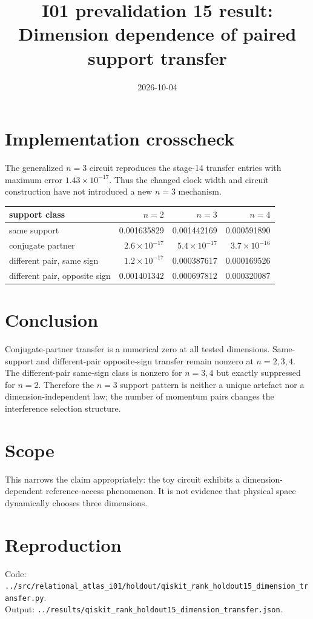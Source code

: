 \documentclass[11pt]{article}
\begin{document}
\title{I01 prevalidation 15 result:\\Dimension dependence of paired support transfer}
\date{2026-10-04}
\maketitle

\section*{Implementation crosscheck}
The generalized $n=3$ circuit reproduces the stage-14 transfer entries with maximum
error $1.43\times10^{-17}$. Thus the changed clock width and circuit construction
have not introduced a new $n=3$ mechanism.

\begin{center}
\begin{tabular}{lrrr}
\toprule
support class & $n=2$ & $n=3$ & $n=4$\\
\midrule
same support & 0.001635829 & 0.001442169 & 0.000591890\\
conjugate partner & $2.6\times10^{-17}$ & $5.4\times10^{-17}$ & $3.7\times10^{-16}$\\
different pair, same sign & $1.2\times10^{-17}$ & 0.000387617 & 0.000169526\\
different pair, opposite sign & 0.001401342 & 0.000697812 & 0.000320087\\
\bottomrule
\end{tabular}
\end{center}

\section*{Conclusion}
Conjugate-partner transfer is a numerical zero at all tested dimensions. Same-support
and different-pair opposite-sign transfer remain nonzero at $n=2,3,4$. The
different-pair same-sign class is nonzero for $n=3,4$ but exactly suppressed for
$n=2$. Therefore the $n=3$ support pattern is neither a unique artefact nor a
dimension-independent law; the number of momentum pairs changes the interference
selection structure.

\section*{Scope}
This narrows the claim appropriately: the toy circuit exhibits a dimension-dependent
reference-access phenomenon. It is not evidence that physical space dynamically
chooses three dimensions.

\section*{Reproduction}
Code: \texttt{../src/relational\_atlas\_i01/holdout/qiskit\_rank\_holdout15\_dimension\_transfer.py}.\\
Output: \texttt{../results/qiskit\_rank\_holdout15\_dimension\_transfer.json}.
\end{document}
